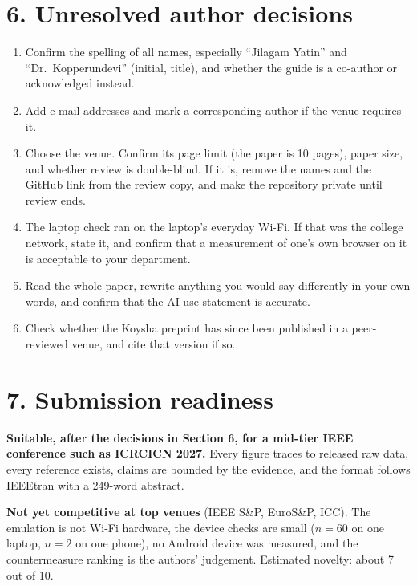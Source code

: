\documentclass[10pt,a4paper]{article}
\begin{document}
\section*{6. Unresolved author decisions}
\begin{enumerate}
\item Confirm the spelling of all names, especially ``Jilagam Yatin'' and ``Dr.\ Kopperundevi'' (initial, title), and whether the guide is a co-author or acknowledged instead.
\item Add e-mail addresses and mark a corresponding author if the venue requires it.
\item Choose the venue. Confirm its page limit (the paper is 10 pages), paper size, and whether review is double-blind. If it is, remove the names and the GitHub link from the review copy, and make the repository private until review ends.
\item The laptop check ran on the laptop's everyday Wi-Fi. If that was the college network, state it, and confirm that a measurement of one's own browser on it is acceptable to your department.
\item Read the whole paper, rewrite anything you would say differently in your own words, and confirm that the AI-use statement is accurate.
\item Check whether the Koysha preprint has since been published in a peer-reviewed venue, and cite that version if so.
\end{enumerate}

\section*{7. Submission readiness}
\textbf{Suitable, after the decisions in Section 6, for a mid-tier IEEE conference such as ICRCICN 2027.} Every figure traces to released raw data, every reference exists, claims are bounded by the evidence, and the format follows IEEEtran with a 249-word abstract.

\textbf{Not yet competitive at top venues} (IEEE S\&P, EuroS\&P, ICC). The emulation is not Wi-Fi hardware, the device checks are small ($n=60$ on one laptop, $n=2$ on one phone), no Android device was measured, and the countermeasure ranking is the authors' judgement. Estimated novelty: about 7 out of 10.
\end{document}

